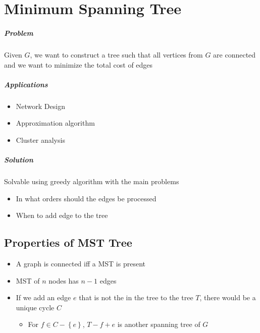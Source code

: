 \chapter{Minimum Spanning Tree}

\paragraph{Problem} Given $ G $, we want to construct a tree such that
all vertices from $ G $ are connected and we want to minimize the total cost
of edges


\paragraph{Applications}
\begin{itemize}
  \item Network Design
  \item Approximation algorithm
  \item Cluster analysis
\end{itemize}

\paragraph{Solution} Solvable using greedy algorithm with the main problems
\begin{itemize}
  \item In what orders should the edges be processed
  \item When to add edge to the tree
\end{itemize}

\begin{algorithm}[H]
\end{algorithm}

\section{Properties of MST Tree}

  \begin{itemize}
    \item A graph is connected iff a MST is present
    \item MST of $ n $ nodes has $ n - 1 $ edges
    \item If we add an edge $ e $ that is not the in the tree to the tree $ T $,
    there would be a unique cycle $ C $
    \begin{itemize}
      \item For $ f \in C - \left\{ e \right\} $, $ T - f + e $ is another
      spanning tree of $ G $
    \end{itemize}
  \end{itemize}

